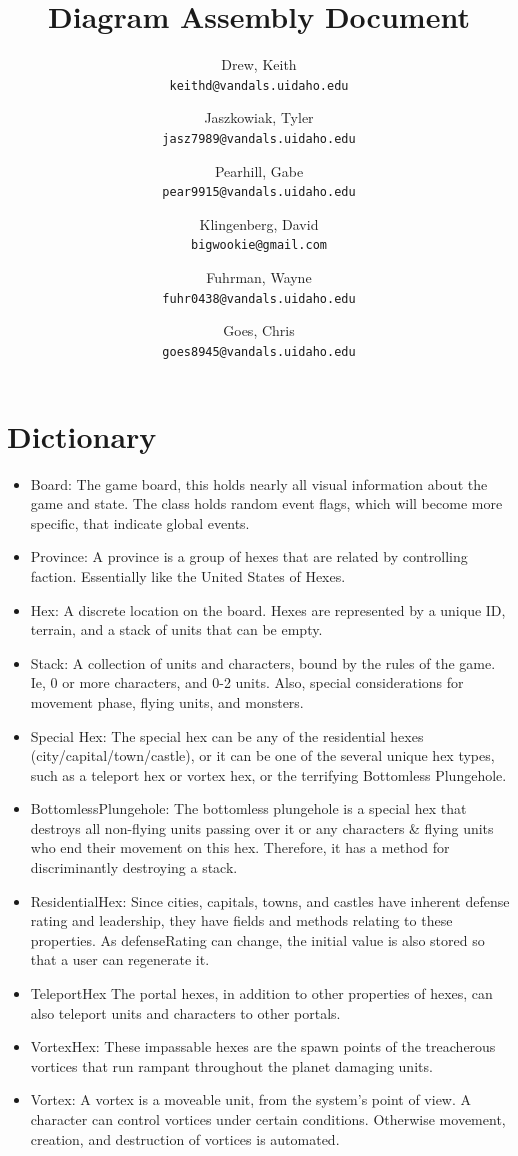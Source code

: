\documentclass[12pt,a4paper]{article}
\author{
  Drew, Keith\\
  \texttt{keithd@vandals.uidaho.edu}
  \and
  Jaszkowiak, Tyler\\
  \texttt{jasz7989@vandals.uidaho.edu}
  \and
  Pearhill, Gabe\\
  \texttt{pear9915@vandals.uidaho.edu}
  \and
  Klingenberg, David\\
  \texttt{bigwookie@gmail.com}
  \and 
  Fuhrman, Wayne\\
  \texttt{fuhr0438@vandals.uidaho.edu}
  \and
  Goes, Chris\\
  \texttt{goes8945@vandals.uidaho.edu}
}
\title{Diagram Assembly Document}
\begin{document}
\maketitle
\section{Dictionary}
\begin{itemize}
\item Board: The game board, this holds nearly all visual information about the game and state. The class holds random event flags, which will become more specific, that indicate global events.
\item Province: A province is a group of hexes that are related by controlling faction. Essentially like the United States of Hexes. 
\item Hex: A discrete location on the board. Hexes are represented by a unique ID, terrain, and a stack of units that can be empty.
\item Stack: A collection of units and characters, bound by the rules of the game. Ie, 0 or more characters, and 0-2 units. Also, special considerations for movement phase, flying units, and monsters.
\item Special Hex: The special hex can be any of the residential hexes (city/capital/town/castle), or it can be one of the several unique hex types, such as a teleport hex or vortex hex, or the terrifying Bottomless Plungehole.
\item BottomlessPlungehole: The bottomless plungehole is a special hex that destroys all non-flying units passing over it or any characters \& flying units who end their movement on this hex. Therefore, it has a method for discriminantly destroying a stack.
\item ResidentialHex: Since cities, capitals, towns, and castles have inherent defense rating and leadership, they have fields and methods relating to these properties. As defenseRating can change, the initial value is also stored so that a user can regenerate it.
\item TeleportHex The portal hexes, in addition to other properties of hexes, can also teleport units and characters to other portals.
\item VortexHex: These impassable hexes are the spawn points of the treacherous vortices that run rampant throughout the planet damaging units.
\item Vortex: A vortex is a moveable unit, from the system's point of view. A character can control vortices under certain conditions. Otherwise movement, creation, and destruction of vortices is automated.


\end{itemize}
\end{document}
